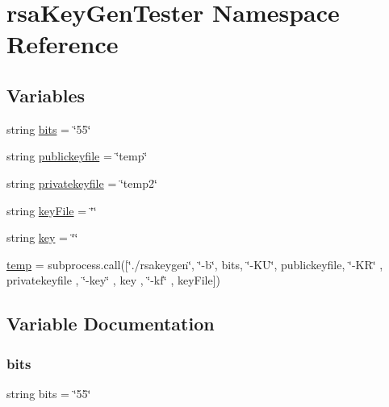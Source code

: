 \hypertarget{namespacersa_key_gen_tester}{}\section{rsa\+Key\+Gen\+Tester Namespace Reference}
\label{namespacersa_key_gen_tester}
\subsection*{Variables}
\begin{DoxyCompactItemize}
\item 
string \hyperlink{namespacersa_key_gen_tester_a6023da76f3e2f519f3bf815647980313}{bits} = \char`\"{}55\char`\"{}
\item 
string \hyperlink{namespacersa_key_gen_tester_aadfca7c8e87311f9a2de04174ef81764}{publickeyfile} = \char`\"{}temp\char`\"{}
\item 
string \hyperlink{namespacersa_key_gen_tester_a3ea08c667ce5a470d757dfab83e7534e}{privatekeyfile} = \char`\"{}temp2\char`\"{}
\item 
string \hyperlink{namespacersa_key_gen_tester_a399a06f7a52ec2592bd7dc1fe0998548}{key\+File} = \char`\"{}\char`\"{}
\item 
string \hyperlink{namespacersa_key_gen_tester_aa8fa75d45876bcbe59f33f49e7d3572d}{key} = \char`\"{}\char`\"{}
\item 
\hyperlink{namespacersa_key_gen_tester_a905c521e05ec8042631a912b71d0454e}{temp} = subprocess.\+call(\mbox{[}\char`\"{}./rsakeygen\char`\"{}, \char`\"{}-\/b\char`\"{}, bits, \char`\"{}-\/KU\char`\"{}, publickeyfile, \char`\"{}-\/KR\char`\"{} , privatekeyfile , \char`\"{}-\/key\char`\"{} , key , \char`\"{}-\/kf\char`\"{} , key\+File\mbox{]})
\end{DoxyCompactItemize}


\subsection{Variable Documentation}
\mbox{\label{namespacersa_key_gen_tester_a6023da76f3e2f519f3bf815647980313}} 
\subsubsection{\texorpdfstring{bits}{bits}}
{\footnotesize\ttfamily string bits = \char`\"{}55\char`\"{}}



